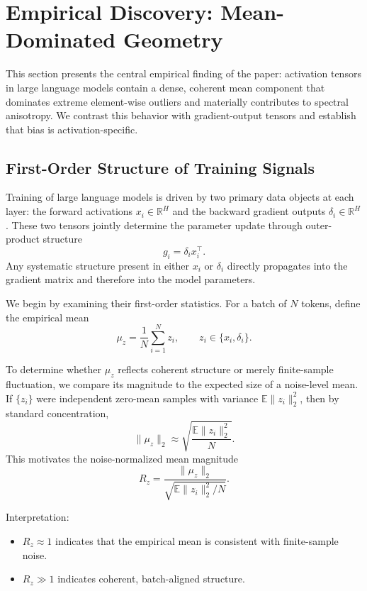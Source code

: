 \section{Empirical Discovery: Mean-Dominated Geometry}
\label{sec:empirical}

This section presents the central empirical finding of the paper:
activation tensors in large language models contain a dense, coherent mean
component that dominates extreme element-wise outliers and materially
contributes to spectral anisotropy.
We contrast this behavior with gradient-output tensors and establish that
bias is activation-specific.

\subsection{First-Order Structure of Training Signals}
\label{subsec:first_order_asymmetry}

Training of large language models is driven by two primary data objects at each layer:
the forward activations $x_i \in \mathbb{R}^H$ and the backward gradient outputs
$\delta_i \in \mathbb{R}^H$.
These two tensors jointly determine the parameter update through outer-product
structure
\[
g_i = \delta_i x_i^\top.
\]
Any systematic structure present in either $x_i$ or $\delta_i$
directly propagates into the gradient matrix and therefore into the model parameters.

We begin by examining their first-order statistics.
For a batch of $N$ tokens, define the empirical mean
\[
\mu_z = \frac{1}{N} \sum_{i=1}^N z_i,
\qquad z_i \in \{x_i, \delta_i\}.
\]

To determine whether $\mu_z$ reflects coherent structure or merely finite-sample
fluctuation, we compare its magnitude to the expected size of a noise-level mean.
If $\{z_i\}$ were independent zero-mean samples with variance
$\mathbb{E}\|z_i\|_2^2$, then by standard concentration,
\[
\|\mu_z\|_2 \approx \sqrt{\frac{\mathbb{E}\|z_i\|_2^2}{N}}.
\]
This motivates the noise-normalized mean magnitude
\[
R_z
=
\frac{\|\mu_z\|_2}
{\sqrt{\mathbb{E}\|z_i\|_2^2 / N}}.
\]

Interpretation:
\begin{itemize}
\item $R_z \approx 1$ indicates that the empirical mean is consistent with
finite-sample noise.
\item $R_z \gg 1$ indicates coherent, batch-aligned structure.
\end{itemize}


